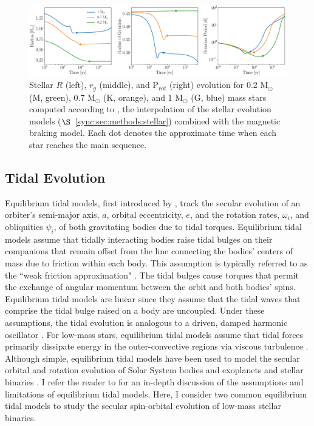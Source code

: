 
\begin{figure}
	\includegraphics[width=\columnwidth]{stellarExample.pdf}
   \caption{Stellar $R$ (left), $r_g$ (middle), and P$_{rot}$ (right) evolution for 0.2 M$_{\odot}$ (M, green), 0.7 M$_{\odot}$ (K, orange), and 1 M$_{\odot}$ (G, blue) mass stars computed according to \stellar, the interpolation of the \citet{Baraffe2015} stellar evolution models ($\S$~\ref{sync:sec:methods:stellar}) combined with the \citet{Matt2015} magnetic braking model. Each dot denotes the approximate time when each star reaches the main sequence.}%
    \label{sync:fig:stellarExample}%
\end{figure}

\subsection{Tidal Evolution} \label{sync:sec:methods:eqtide}

 Equilibrium tidal models, first introduced by \citet{Darwin1880}, track the secular evolution of an orbiter's semi-major axis, $a$, orbital eccentricity, $e$, and the rotation rates, $\omega_i$, and obliquities $\psi_i$, of both gravitating bodies due to tidal torques. Equilibrium tidal models assume that tidally interacting bodies raise tidal bulges on their companions that remain offset from the line connecting the bodies' centers of mass due to friction within each body. This assumption is typically referred to as the ``weak friction approximation" \citep{Zahn2008}.  The tidal bulges cause torques that permit the exchange of angular momentum between the orbit and both bodies' spins. Equilibrium tidal models are linear since they assume that the tidal waves that comprise the tidal bulge raised on a body are uncoupled. Under these assumptions, the tidal evolution is analogous to a driven, damped harmonic oscillator \citep{Greenberg2009}. For low-mass stars, equilibrium tidal models assume that tidal forces primarily dissipate energy in the outer-convective regions via viscous turbulence \citep[see][]{Zahn2008}. Although simple, equilibrium tidal models have been used to model the secular orbital and rotation evolution of Solar System bodies and exoplanets \citep[e.g.][]{Goldreich1966,Jackson2009,Leconte2010,Heller2011,Barnes2013,Barnes2017} and stellar binaries \citep[e.g.][]{Zahn1989,Zahn2008,Khaliullin2011,Repetto2014,Fleming2018}. I refer the reader to \citet{Barnes2017} for an in-depth discussion of the assumptions and limitations of equilibrium tidal models. Here, I consider two common equilibrium tidal models to study the secular spin-orbital evolution of low-mass stellar binaries.  


